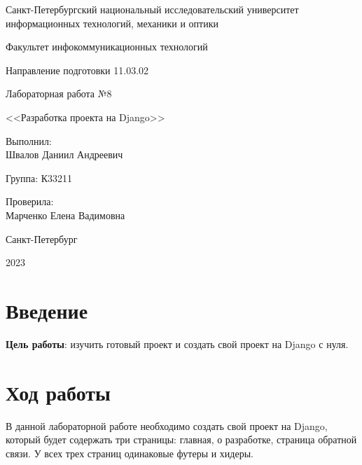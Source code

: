 \documentclass[a4paper, 14pt]{extarticle}
\begin{document}
\begin{titlepage}
  \vspace{0pt plus2fill}
  \noindent

  \vspace{0pt plus6fill}
  \begin{center}
    Санкт-Петербургский национальный исследовательский университет
    информационных технологий, механики и оптики

    \vspace{0pt plus3fill}

    Факультет инфокоммуникационных технологий

    Направление подготовки 11.03.02

    \vspace{0pt plus2fill}

    Лабораторная работа №8

    <<Разработка проекта на Django>>

  \end{center}

  \vspace{0pt plus9fill}
  \begin{flushright}
    Выполнил: \\
    Швалов Даниил Андреевич

    Группа: К33211

    Проверила: \\
    Марченко Елена Вадимовна
  \end{flushright}

  \vspace{0pt plus2fill}
  \begin{center}
    Санкт-Петербург

    2023
  \end{center}
\end{titlepage}

\section{Введение}

\textbf{Цель работы}: изучить готовый проект и создать свой проект на Django с
нуля.

\section{Ход работы}

В данной лабораторной работе необходимо создать свой проект на Django, который
будет содержать три страницы: главная, о разработке, страница обратной связи. У
всех трех страниц одинаковые футеры и хидеры.
\end{document}
